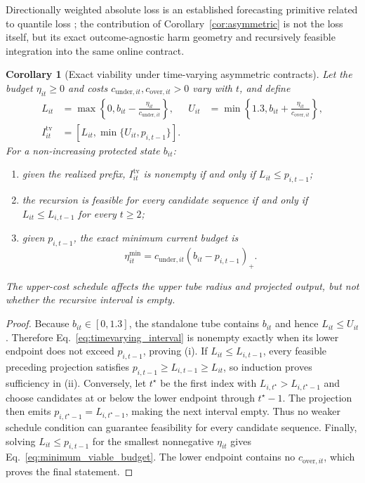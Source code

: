 \documentclass[11pt]{article}
\newtheorem{corollary}{Corollary}
\begin{document}
Directionally weighted absolute loss is an established forecasting primitive related to quantile loss \citep{koenker1978regression}; the contribution of Corollary~\ref{cor:asymmetric} is not the loss itself, but its exact outcome-agnostic harm geometry and recursively feasible integration into the same online contract.

\begin{corollary}[Exact viability under time-varying asymmetric contracts]
\label{cor:timevarying}
Let the budget $\eta_{it}\geq0$ and costs $c_{\mathrm{under},it},c_{\mathrm{over},it}>0$ vary with $t$, and define
\begin{align}
  L_{it}&=\max\!\left\{0,b_{it}-\frac{\eta_{it}}{c_{\mathrm{under},it}}\right\},
  &
  U_{it}&=\min\!\left\{1.3,b_{it}+\frac{\eta_{it}}{c_{\mathrm{over},it}}\right\},
  \label{eq:timevarying_bounds}\\
  I^{\mathrm{tv}}_{it}&=[L_{it},\min\{U_{it},p_{i,t-1}\}].
  \label{eq:timevarying_interval}
\end{align}
For a non-increasing protected state $b_{it}$:
\begin{enumerate}[label=(\roman*),leftmargin=*]
  \item given the realized prefix, $I^{\mathrm{tv}}_{it}$ is nonempty if and only if $L_{it}\leq p_{i,t-1}$;
  \item the recursion is feasible for every candidate sequence if and only if $L_{it}\leq L_{i,t-1}$ for every $t\geq2$;
  \item given $p_{i,t-1}$, the exact minimum current budget is
  \begin{equation}
    \eta^{\min}_{it}
    =c_{\mathrm{under},it}(b_{it}-p_{i,t-1})_{+}.
    \label{eq:minimum_viable_budget}
  \end{equation}
\end{enumerate}
The upper-cost schedule affects the upper tube radius and projected output, but not whether the recursive interval is empty.
\end{corollary}
\begin{proof}
Because $b_{it}\in[0,1.3]$, the standalone tube contains $b_{it}$ and hence $L_{it}\leq U_{it}$. Therefore Eq.~\eqref{eq:timevarying_interval} is nonempty exactly when its lower endpoint does not exceed $p_{i,t-1}$, proving (i). If $L_{it}\leq L_{i,t-1}$, every feasible preceding projection satisfies $p_{i,t-1}\geq L_{i,t-1}\geq L_{it}$, so induction proves sufficiency in (ii). Conversely, let $t^{\star}$ be the first index with $L_{i,t^{\star}}>L_{i,t^{\star}-1}$ and choose candidates at or below the lower endpoint through $t^{\star}-1$. The projection then emits $p_{i,t^{\star}-1}=L_{i,t^{\star}-1}$, making the next interval empty. Thus no weaker schedule condition can guarantee feasibility for every candidate sequence. Finally, solving $L_{it}\leq p_{i,t-1}$ for the smallest nonnegative $\eta_{it}$ gives Eq.~\eqref{eq:minimum_viable_budget}. The lower endpoint contains no $c_{\mathrm{over},it}$, which proves the final statement.
\end{proof}
\end{document}
